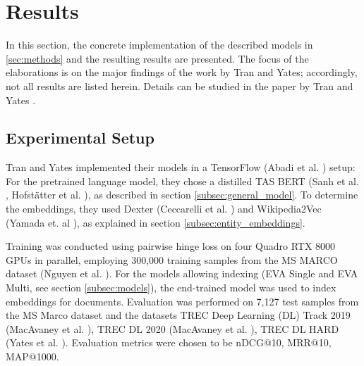 \section{Results}\label{sec:results}

In this section, the concrete implementation of the described models in \autoref{sec:methods} and the resulting results are presented. The focus of the elaborations is on the major findings of the work by Tran and Yates; accordingly, not all results are listed herein. Details can be studied in the paper by Tran and Yates \cite{tran2022dense}.

\subsection{Experimental Setup}

Tran and Yates implemented their models in a TensorFlow (Abadi et al. \cite{abadi2016tensorflow}) setup: For the pretrained language model, they chose a distilled TAS BERT (Sanh et al. \cite{sanh2019distilbert}, Hofstätter et al. \cite{tasbert}), as described in section \ref{subsec:general_model}. To determine the embeddings, they used Dexter (Ceccarelli et al. \cite{ceccarelli2013dexter}) and Wikipedia2Vec (Yamada et. al \cite{yamada2018wikipedia2vec}), as explained in section \ref{subsec:entity_embeddings}. 

Training was conducted using pairwise hinge loss on four Quadro RTX 8000 GPUs in parallel, employing 300,000 training samples from the MS MARCO dataset (Nguyen et al. \cite{nguyen2016ms}). For the models allowing indexing (EVA Single and EVA Multi, see section \ref{subsec:models}), the end-trained model was used to index embeddings for documents. Evaluation was performed on 7,127 test samples from the MS Marco dataset and the datasets TREC Deep Learning (DL) Track 2019 (MacAvaney et al. \cite{trec_dl_2019}), TREC DL 2020 (MacAvaney et al. \cite{trec_dl_2020}), TREC DL HARD (Yates et al. \cite{dl_hard}). Evaluation metrics were chosen to be nDCG@10, MRR@10, MAP@1000.

